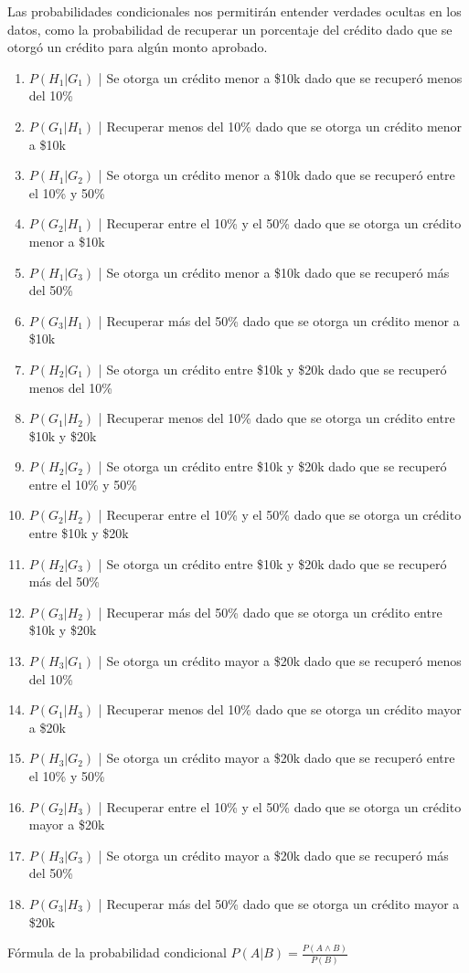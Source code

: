 \documentclass{article}
\begin{document}
Las probabilidades condicionales nos permitirán entender verdades ocultas en los datos, como la probabilidad de recuperar un porcentaje del crédito dado que se otorgó un crédito para algún monto aprobado.
\begin{enumerate}
    \item $P(H_1 | G_1)$ | Se otorga un crédito menor a \$10k dado que se recuperó menos del 10\%
    \item $P(G_1 | H_1)$ | Recuperar menos del 10\% dado que se otorga un crédito menor a \$10k
    \item $P(H_1 | G_2)$ | Se otorga un crédito menor a \$10k dado que se recuperó entre el 10\% y 50\%
    \item $P(G_2 | H_1)$ | Recuperar entre el 10\% y el 50\% dado que se otorga un crédito menor a \$10k
    \item $P(H_1 | G_3)$ | Se otorga un crédito menor a \$10k dado que se recuperó más del 50\%
    \item $P(G_3 | H_1)$ | Recuperar más del 50\% dado que se otorga un crédito menor a \$10k
    \item $P(H_2 | G_1)$ | Se otorga un crédito entre \$10k y \$20k dado que se recuperó menos del 10\%
    \item $P(G_1 | H_2)$ | Recuperar menos del 10\% dado que se otorga un crédito entre \$10k y \$20k
    \item $P(H_2 | G_2)$ | Se otorga un crédito entre \$10k y \$20k dado que se recuperó entre el 10\% y 50\%
    \item $P(G_2 | H_2)$ | Recuperar entre el 10\% y el 50\% dado que se otorga un crédito entre \$10k y \$20k
    \item $P(H_2 | G_3)$ | Se otorga un crédito entre \$10k y \$20k dado que se recuperó más del 50\%
    \item $P(G_3 | H_2)$ | Recuperar más del 50\% dado que se otorga un crédito entre \$10k y \$20k
    \item $P(H_3 | G_1)$ | Se otorga un crédito mayor a \$20k dado que se recuperó menos del 10\%
    \item $P(G_1 | H_3)$ | Recuperar menos del 10\% dado que se otorga un crédito mayor a \$20k
    \item $P(H_3 | G_2)$ | Se otorga un crédito mayor a \$20k dado que se recuperó entre el 10\% y 50\%
    \item $P(G_2 | H_3)$ | Recuperar entre el 10\% y el 50\% dado que se otorga un crédito mayor a \$20k
    \item $P(H_3 | G_3)$ | Se otorga un crédito mayor a \$20k dado que se recuperó más del 50\%
    \item $P(G_3 | H_3)$ | Recuperar más del 50\% dado que se otorga un crédito mayor a \$20k
\end{enumerate}
Fórmula de la probabilidad condicional
$P(A|B) = \frac{P(A \land B)}{P(B)}$
\end{document}
